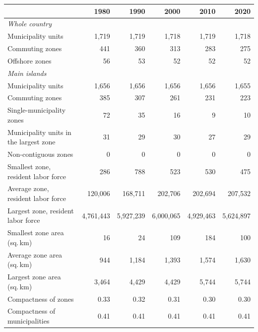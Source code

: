 \begin{tabular}{lrrrrr}
\hline\hline
& 1980 & 1990 & 2000 & 2010 & 2020 \\
\hline
\multicolumn{6}{l}{\emph{Whole country}} \\
\quad Municipality units & 1,719 & 1,719 & 1,718 & 1,719 & 1,718 \\
\quad Commuting zones & 441 & 360 & 313 & 283 & 275 \\
\quad Offshore zones & 56 & 53 & 52 & 52 & 52 \\[3pt]
\multicolumn{6}{l}{\emph{Main islands}} \\
\quad Municipality units & 1,656 & 1,656 & 1,656 & 1,656 & 1,655 \\
\quad Commuting zones & 385 & 307 & 261 & 231 & 223 \\
\quad Single-municipality zones & 72 & 35 & 16 & 9 & 10 \\
\quad Municipality units in the largest zone & 31 & 29 & 30 & 27 & 29 \\
\quad Non-contiguous zones & 0 & 0 & 0 & 0 & 0 \\[3pt]
\quad Smallest zone, resident labor force & 286 & 788 & 523 & 530 & 475 \\
\quad Average zone, resident labor force & 120,006 & 168,711 & 202,706 & 202,694 & 207,532 \\
\quad Largest zone, resident labor force & 4,761,443 & 5,927,239 & 6,000,065 & 4,929,463 & 5,624,897 \\[3pt]
\quad Smallest zone area (sq.\,km) & 16 & 24 & 109 & 184 & 100 \\
\quad Average zone area (sq.\,km) & 944 & 1,184 & 1,393 & 1,574 & 1,630 \\
\quad Largest zone area (sq.\,km) & 3,464 & 4,429 & 4,429 & 5,744 & 5,744 \\[3pt]
\quad Compactness of zones & 0.33 & 0.32 & 0.31 & 0.30 & 0.30 \\
\quad Compactness of municipalities & 0.41 & 0.41 & 0.41 & 0.41 & 0.41 \\
\hline\hline
\end{tabular}
